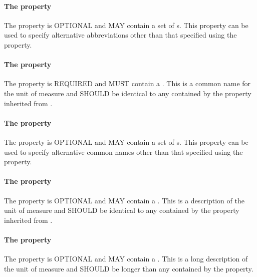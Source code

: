 \paragraph{The  property}\label{sec:alternativeSymbols:Unit}
The  property is OPTIONAL and MAY contain a set of s. This property can be used to specify alternative abbreviations other than that specified using the  property.

\paragraph{The  property}\label{sec:label:Unit}
The  property is REQUIRED and MUST contain a . This  is a common name for the unit of measure and SHOULD be identical to any  contained by the  property inherited from .

\paragraph{The  property}\label{sec:alternativeLabels:Unit}
The  property is OPTIONAL and MAY contain a set of s. This property can be used to specify alternative common names other than that specified using the  property.

\paragraph{The  property}\label{sec:comment:Unit}
The  property is OPTIONAL and MAY contain a . This  is a description of the unit of measure and SHOULD be identical to any  contained by the  property inherited from .

\paragraph{The  property}\label{sec:longcomment:Unit}
The  property is OPTIONAL and MAY contain a . This  is a long description of the unit of measure and SHOULD be longer than any  contained by the  property.

